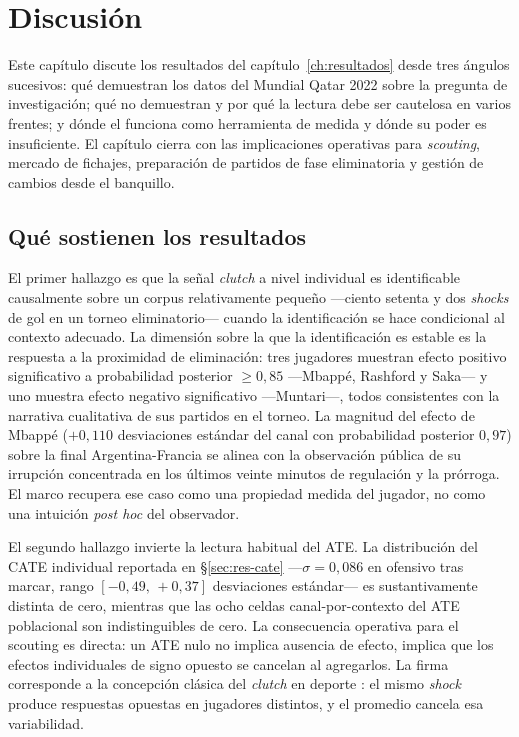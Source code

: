 \chapter{Discusión}
\label{ch:discusion}

Este capítulo discute los resultados del capítulo~\ref{ch:resultados}
desde tres ángulos sucesivos: qué demuestran los datos del Mundial
Qatar 2022 sobre la pregunta de investigación; qué no demuestran y
por qué la lectura debe ser cautelosa en varios frentes; y dónde el
\CCV funciona como herramienta de medida y dónde su poder es
insuficiente. El capítulo cierra con las implicaciones operativas
para \textit{scouting}, mercado de fichajes, preparación de partidos
de fase eliminatoria y gestión de cambios desde el banquillo.


\section{Qué sostienen los resultados}
\label{sec:disc-demuestran}

El primer hallazgo es que la señal \textit{clutch} a nivel individual
es identificable causalmente sobre un corpus relativamente pequeño
---ciento setenta y dos \textit{shocks} de gol en un torneo
eliminatorio--- cuando la identificación se hace condicional al
contexto adecuado. La dimensión sobre la que la identificación es
estable es la respuesta a la proximidad de eliminación: tres
jugadores muestran efecto positivo significativo a probabilidad
posterior $\geq 0{,}85$ ---Mbappé, Rashford y Saka--- y uno muestra
efecto negativo significativo ---Muntari---, todos consistentes con
la narrativa cualitativa de sus partidos en el torneo. La magnitud
del efecto de Mbappé ($+0{,}110$ desviaciones estándar del canal con
probabilidad posterior $0{,}97$) sobre la final Argentina-Francia se
alinea con la observación pública de su irrupción concentrada en los
últimos veinte minutos de regulación y la prórroga. El marco recupera
ese caso como una propiedad medida del jugador, no como una
intuición \textit{post hoc} del observador.

El segundo hallazgo invierte la lectura habitual del ATE. La
distribución del CATE individual reportada en
§\ref{sec:res-cate} ---$\sigma = 0{,}086$ en ofensivo tras marcar,
rango $[-0{,}49,\, +0{,}37]$ desviaciones estándar--- es
sustantivamente distinta de cero, mientras que las ocho celdas
canal-por-contexto del ATE poblacional son indistinguibles de cero.
La consecuencia operativa para el scouting es directa: un ATE nulo
no implica ausencia de efecto, implica que los efectos individuales
de signo opuesto se cancelan al agregarlos. La firma corresponde a
la concepción clásica del \textit{clutch} en deporte
\parencite{Otten2009Clutch}: el mismo \textit{shock} produce
respuestas opuestas en jugadores distintos, y el promedio cancela
esa variabilidad.

